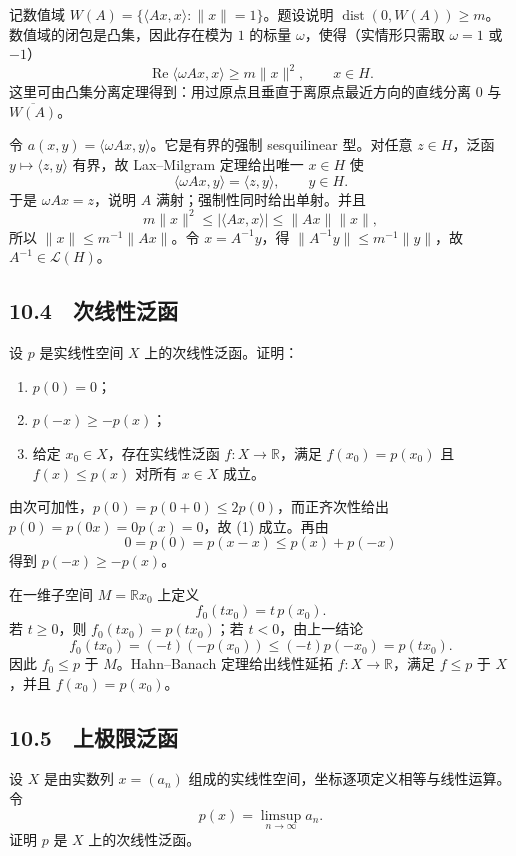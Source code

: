 记数值域 $W(A)=\{\langle Ax,x\rangle:\|x\|=1\}$。题设说明
$\operatorname{dist}(0,W(A))\ge m$。数值域的闭包是凸集，因此存在模为 $1$ 的标量
$\omega$，使得（实情形只需取 $\omega=1$ 或 $-1$）
\[
 \operatorname{Re}\langle \omega Ax,x\rangle\ge m\|x\|^2,
 \qquad x\in H.
\]
这里可由凸集分离定理得到：用过原点且垂直于离原点最近方向的直线分离
$0$ 与 $\overline{W(A)}$。

令 $a(x,y)=\langle\omega Ax,y\rangle$。它是有界的强制 sesquilinear 型。对任意
$z\in H$，泛函 $y\mapsto\langle z,y\rangle$ 有界，故 Lax--Milgram 定理给出唯一
$x\in H$ 使
\[
 \langle\omega Ax,y\rangle=\langle z,y\rangle,\qquad y\in H.
\]
于是 $\omega Ax=z$，说明 $A$ 满射；强制性同时给出单射。并且
\[
 m\|x\|^2\le|\langle Ax,x\rangle|\le\|Ax\|\|x\|,
\]
所以 $\|x\|\le m^{-1}\|Ax\|$。令 $x=A^{-1}y$，得
$\|A^{-1}y\|\le m^{-1}\|y\|$，故 $A^{-1}\in\mathcal L(H)$。

\subsection*{10.4　次线性泛函}

\begin{problem}
设 $p$ 是实线性空间 $X$ 上的次线性泛函。证明：
\begin{enumerate}
 \item $p(0)=0$；
 \item $p(-x)\ge-p(x)$；
 \item 给定 $x_0\in X$，存在实线性泛函 $f:X\to\mathbb R$，满足
 $f(x_0)=p(x_0)$ 且 $f(x)\le p(x)$ 对所有 $x\in X$ 成立。
\end{enumerate}
\end{problem}

由次可加性，$p(0)=p(0+0)\le2p(0)$，而正齐次性给出
$p(0)=p(0x)=0p(x)=0$，故 (1) 成立。再由
\[
 0=p(0)=p(x-x)\le p(x)+p(-x)
\]
得到 $p(-x)\ge-p(x)$。

在一维子空间 $M=\mathbb Rx_0$ 上定义
\[
 f_0(tx_0)=t\,p(x_0).
\]
若 $t\ge0$，则 $f_0(tx_0)=p(tx_0)$；若 $t<0$，由上一结论
\[
 f_0(tx_0)=(-t)(-p(x_0))\le(-t)p(-x_0)=p(tx_0).
\]
因此 $f_0\le p$ 于 $M$。Hahn--Banach 定理给出线性延拓 $f:X\to\mathbb R$，满足
$f\le p$ 于 $X$，并且 $f(x_0)=p(x_0)$。

\subsection*{10.5　上极限泛函}

\begin{problem}
设 $X$ 是由实数列 $x=(a_n)$ 组成的实线性空间，坐标逐项定义相等与线性运算。令
\[
 p(x)=\limsup_{n\to\infty}a_n.
\]
证明 $p$ 是 $X$ 上的次线性泛函。
\end{problem}

